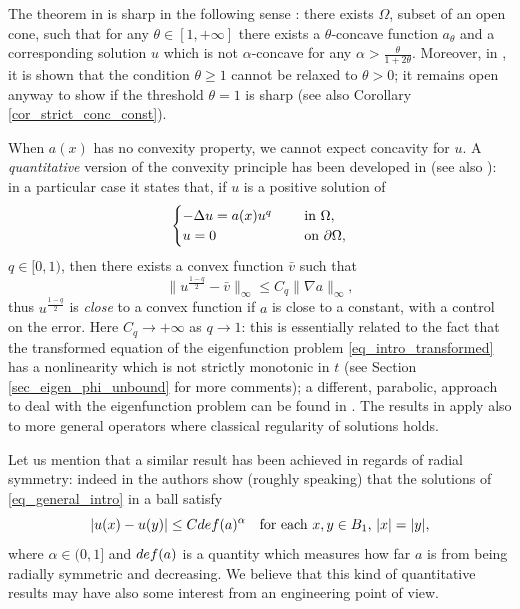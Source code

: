 \documentclass[11pt, reqno]{amsart}
\theoremstyle{definition}
\numberwithin{equation}{section}
\def\norm#1{\|#1\|}
\begin{document}
The theorem in \cite{Ken85} is sharp in the following sense \cite[Theorem 6.2]{Ken85}: there exists $\Omega$, subset of an open cone, such that for any $\theta \in [1,+\infty]$ there exists a $\theta$-concave function $a_{\theta}$ and a corresponding solution $u$ which is not $\alpha$-concave for any $\alpha>\frac{\theta}{1+2\theta}$.
Moreover, in \cite[Theorem 16 in Section 7]{Ken84}, it is shown that the condition $\theta \geq 1$ cannot be relaxed to $\theta>0$; it remains open anyway to show if the threshold $\theta=1$ is sharp (see also Corollary \ref{cor_strict_conc_const}). 

\smallskip

When $a(x)$ has no convexity property, we cannot expect concavity for $u$. 
A \emph{quantitative} version of the convexity principle has been developed in \cite{BuSq20} (see also \cite[Proposition 3.2]{ABCS23}): in a particular case it states that, if $u$ is a positive solution of
$$
 \begin{cases}
-\Delta u = a(x) u^q & \quad \hbox{ in $\Omega$},\\ 
u =0 & \quad \hbox{ on $\partial \Omega$},
\end{cases}
$$
$q \in [0,1)$, then there exists a convex function $\bar{v}$ such that
$$\norm{u^{\frac{1-q}{2}} - \bar{v}}_{\infty} \leq C_q \norm{\nabla a}_{\infty},$$
thus $u^{\frac{1-q}{2}}$ is \emph{close} to a convex function if $a$ is close to a constant, with a control on the error. Here $C_q \to +\infty$ as $q \to 1$: this is essentially related to the fact that the transformed equation of the eigenfunction problem \eqref{eq_intro_transformed} has a nonlinearity which is not strictly monotonic in $t$ (see Section \ref{sec_eigen_phi_unbound} for more comments); a different, parabolic, approach to deal with the eigenfunction problem can be found in \cite{GMrS25}.
The results in \cite{BuSq20, ABCS23} apply also to more general operators where classical regularity of solutions holds.

Let us mention that a similar result has been achieved in regards of radial symmetry: indeed in \cite{CCPP24} the authors show (roughly speaking) that the solutions of \eqref{eq_general_intro} in a ball satisfy
$$|u(x)-u(y)| \leq C \textup{def}(a)^{\alpha} \quad \hbox{for each $x,y \in B_1$, $|x|=|y|$},$$
where $\alpha \in (0,1]$ and $\textup{def}(a)$ is a quantity which measures how far $a$ is from being radially symmetric and decreasing.
We believe that this kind of quantitative results may have also some interest from an engineering point of view.
\end{document}
